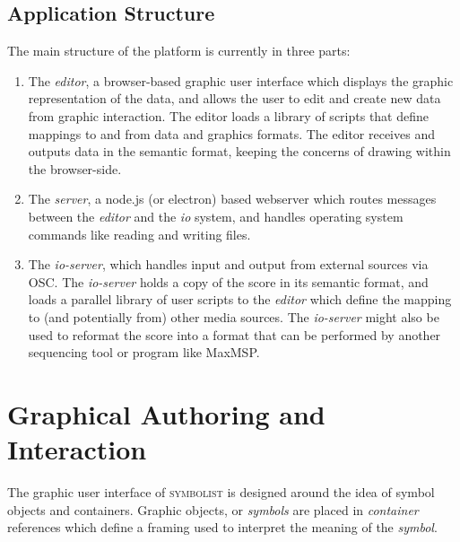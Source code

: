\documentclass{article}
\def\symbolist{\textsc{symbolist}\xspace}
\begin{document}
\subsection{Application Structure}\label{subsec:application_structure}

The main structure of the platform is currently in three parts:

\begin{enumerate}\itemsep0pt
\item The \textit{editor}, a browser-based graphic user interface which displays the graphic representation of the data, and allows the user to edit and create new data from graphic interaction. The editor loads a library of scripts that define mappings to and from data and graphics formats. The editor receives and outputs data in the semantic format, keeping the concerns of drawing within the browser-side.

\item The \textit{server}, a node.js (or electron) based webserver which routes messages between the \textit{editor} and the \textit{io} system, and handles operating system commands like reading and writing files.

\item  The \textit{io-server}, which handles input and output from external sources via OSC. The \textit{io-server} holds a copy of the score in its semantic format, and loads a parallel library of user scripts to the \textit{editor} which define the mapping to (and potentially from) other media sources. The \textit{io-server} might also be used to reformat the score into a format that can be performed by another sequencing tool or program like MaxMSP.
\end{enumerate}


\section{Graphical Authoring and Interaction}\label{editor} %


The graphic user interface of \symbolist is designed around the idea of symbol objects and containers. Graphic objects, or \textit{symbols} are placed in \textit{container} references which define a framing used to interpret the meaning of the \textit{symbol}.
\end{document}

